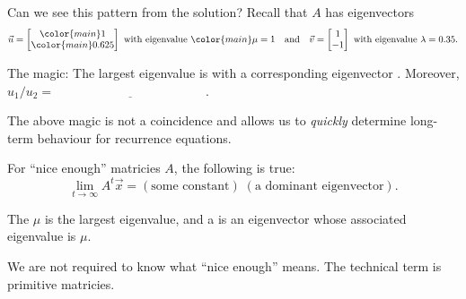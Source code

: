 \documentclass[../main.tex]{subfiles}
\begin{document}
Can we see this pattern from the solution? Recall that \(A\) has eigenvectors 
\[
  \vec{u} = \begin{bmatrix} {\color{main} 1} \\ {\color{main} 0.625} \end{bmatrix} \text{ with eigenvalue } {\color{main} \mu = 1}
  \quad\text{and}\quad
  \vec{v} = \begin{bmatrix}1 \\ -1 \end{bmatrix} \text{ with eigenvalue } \lambda = 0.35.
\]



The magic: The largest eigenvalue is \underline{\hspace{1cm}} with a corresponding eigenvector \underline{\hspace{1cm}}. Moreover, \(u_{1} / u_{2} = \underline{\hspace{2in}}\).

\bigskip

The above magic is not a coincidence and allows us to \emph{quickly} determine long-term behaviour for recurrence equations.

\begin{method}
  For ``nice enough'' matricies \(A\), the following is true:
  \[
    \lim_{t \to \infty} A^{t} \vec{x} = (\text{some constant}) \; (\text{a dominant eigenvector}).
  \]

  The  \(\mu\) is the largest eigenvalue, and a  is an eigenvector whose associated eigenvalue is \(\mu\).
\end{method}

{\footnotesize We are not required to know what ``nice enough'' means. The technical term is primitive matricies.}
\end{document}
